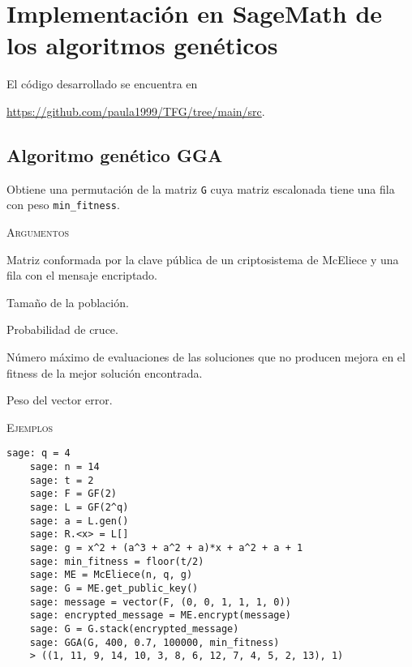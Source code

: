 \chapter[Implementación en SageMath de los algoritmos genéticos]{Implementación en SageMath de los algoritmos genéticos}
\label{annex:sage-geneticos}


El código desarrollado se encuentra en
\begin{center}
\url{https://github.com/paula1999/TFG/tree/main/src}.
\end{center}


\section{Algoritmo genético GGA}

\begin{description}[leftmargin=1em, font=\normalfont\ttfamily, style=nextline]
  \item[GGA(G, N, pc, max\_reinit, min\_fitness)]

  Obtiene una permutación de la matriz \texttt{G} cuya matriz escalonada tiene una fila con peso \texttt{min\_fitness}.

  \textsc{Argumentos}
  \begin{description}[font=\normalfont\ttfamily]
    \item[G] Matriz conformada por la clave pública de un criptosistema de McEliece y una fila con el mensaje encriptado.
    \item[N] Tamaño de la población.
    \item[pc] Probabilidad de cruce.
    \item[max\_reinit] Número máximo de evaluaciones de las soluciones que no producen mejora en el fitness de la mejor solución encontrada.
    \item[min\_fitness] Peso del vector error. 
  \end{description}

  \textsc{Ejemplos}
  \begin{lstlisting}[gobble=4]
    sage: q = 4
    sage: n = 14
    sage: t = 2
    sage: F = GF(2)
    sage: L = GF(2^q)
    sage: a = L.gen()
    sage: R.<x> = L[]
    sage: g = x^2 + (a^3 + a^2 + a)*x + a^2 + a + 1
    sage: min_fitness = floor(t/2)
    sage: ME = McEliece(n, q, g)
    sage: G = ME.get_public_key()
    sage: message = vector(F, (0, 0, 1, 1, 1, 0))
    sage: encrypted_message = ME.encrypt(message)
    sage: G = G.stack(encrypted_message)
    sage: GGA(G, 400, 0.7, 100000, min_fitness)
    > ((1, 11, 9, 14, 10, 3, 8, 6, 12, 7, 4, 5, 2, 13), 1)
  \end{lstlisting}
\end{description}

